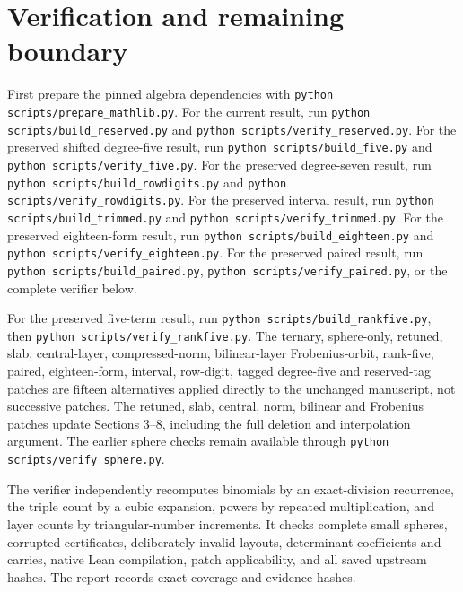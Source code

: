 \documentclass[11pt]{article}
\begin{document}
\section{Verification and remaining boundary}
First prepare the pinned algebra dependencies with
\texttt{python scripts/prepare\_mathlib.py}.
For the current result, run \texttt{python scripts/build\_reserved.py}
and \texttt{python scripts/verify\_reserved.py}.
For the preserved shifted degree-five result, run \texttt{python scripts/build\_five.py}
and \texttt{python scripts/verify\_five.py}.
For the preserved degree-seven result, run \texttt{python scripts/build\_rowdigits.py}
and \texttt{python scripts/verify\_rowdigits.py}.
For the preserved interval result, run \texttt{python scripts/build\_trimmed.py}
and \texttt{python scripts/verify\_trimmed.py}.
For the preserved eighteen-form result, run
\texttt{python scripts/build\_eighteen.py} and
\texttt{python scripts/verify\_eighteen.py}.
For the preserved paired result, run \texttt{python scripts/build\_paired.py},
\texttt{python scripts/verify\_paired.py}, or the complete verifier below.

For the preserved five-term result, run \texttt{python scripts/build\_rankfive.py},
then \texttt{python scripts/verify\_rankfive.py}. The ternary,
sphere-only, retuned, slab, central-layer, compressed-norm, bilinear-layer
Frobenius-orbit, rank-five, paired, eighteen-form, interval, row-digit, tagged degree-five and reserved-tag patches are fifteen alternatives applied
directly to the unchanged manuscript, not successive patches.
The retuned, slab, central, norm, bilinear and Frobenius patches update Sections 3--8, including the full deletion
and interpolation argument.
The earlier sphere checks remain available through
\texttt{python scripts/verify\_sphere.py}.

The verifier independently recomputes binomials by an exact-division
recurrence, the triple count by a cubic expansion, powers by repeated
multiplication, and layer counts by triangular-number increments.
It checks complete small spheres, corrupted certificates, deliberately
invalid layouts, determinant coefficients and carries, native Lean
compilation, patch applicability, and all saved upstream hashes.
The report records exact coverage and evidence hashes.
\end{document}

